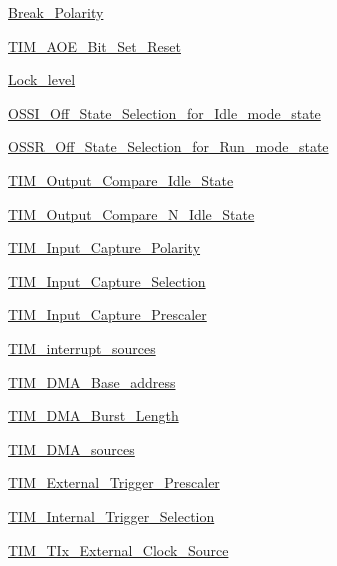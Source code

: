 \begin{DoxyCompactItemize}
\hyperlink{group___break___polarity}{Break\+\_\+\+Polarity}
\item 
\hyperlink{group___t_i_m___a_o_e___bit___set___reset}{T\+I\+M\+\_\+\+A\+O\+E\+\_\+\+Bit\+\_\+\+Set\+\_\+\+Reset}
\item 
\hyperlink{group___lock__level}{Lock\+\_\+level}
\item 
\hyperlink{group___o_s_s_i___off___state___selection__for___idle__mode__state}{O\+S\+S\+I\+\_\+\+Off\+\_\+\+State\+\_\+\+Selection\+\_\+for\+\_\+\+Idle\+\_\+mode\+\_\+state}
\item 
\hyperlink{group___o_s_s_r___off___state___selection__for___run__mode__state}{O\+S\+S\+R\+\_\+\+Off\+\_\+\+State\+\_\+\+Selection\+\_\+for\+\_\+\+Run\+\_\+mode\+\_\+state}
\item 
\hyperlink{group___t_i_m___output___compare___idle___state}{T\+I\+M\+\_\+\+Output\+\_\+\+Compare\+\_\+\+Idle\+\_\+\+State}
\item 
\hyperlink{group___t_i_m___output___compare___n___idle___state}{T\+I\+M\+\_\+\+Output\+\_\+\+Compare\+\_\+\+N\+\_\+\+Idle\+\_\+\+State}
\item 
\hyperlink{group___t_i_m___input___capture___polarity}{T\+I\+M\+\_\+\+Input\+\_\+\+Capture\+\_\+\+Polarity}
\item 
\hyperlink{group___t_i_m___input___capture___selection}{T\+I\+M\+\_\+\+Input\+\_\+\+Capture\+\_\+\+Selection}
\item 
\hyperlink{group___t_i_m___input___capture___prescaler}{T\+I\+M\+\_\+\+Input\+\_\+\+Capture\+\_\+\+Prescaler}
\item 
\hyperlink{group___t_i_m__interrupt__sources}{T\+I\+M\+\_\+interrupt\+\_\+sources}
\item 
\hyperlink{group___t_i_m___d_m_a___base__address}{T\+I\+M\+\_\+\+D\+M\+A\+\_\+\+Base\+\_\+address}
\item 
\hyperlink{group___t_i_m___d_m_a___burst___length}{T\+I\+M\+\_\+\+D\+M\+A\+\_\+\+Burst\+\_\+\+Length}
\item 
\hyperlink{group___t_i_m___d_m_a__sources}{T\+I\+M\+\_\+\+D\+M\+A\+\_\+sources}
\item 
\hyperlink{group___t_i_m___external___trigger___prescaler}{T\+I\+M\+\_\+\+External\+\_\+\+Trigger\+\_\+\+Prescaler}
\item 
\hyperlink{group___t_i_m___internal___trigger___selection}{T\+I\+M\+\_\+\+Internal\+\_\+\+Trigger\+\_\+\+Selection}
\item 
\hyperlink{group___t_i_m___t_ix___external___clock___source}{T\+I\+M\+\_\+\+T\+Ix\+\_\+\+External\+\_\+\+Clock\+\_\+\+Source}

\end{DoxyCompactItemize}
